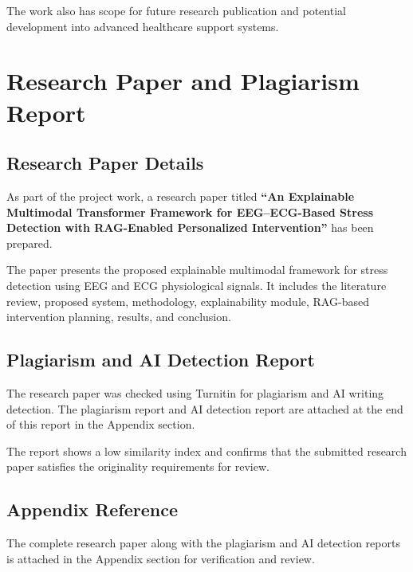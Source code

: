 \documentclass[12pt,a4paper]{report}
\begin{document}
The work also has scope for future research publication and potential development into advanced healthcare support systems.

\chapter{Research Paper and Plagiarism Report}

\section{Research Paper Details}

As part of the project work, a research paper titled 
\textbf{``An Explainable Multimodal Transformer Framework for EEG--ECG-Based Stress Detection with RAG-Enabled Personalized Intervention''}
has been prepared.

The paper presents the proposed explainable multimodal framework for stress detection using EEG and ECG physiological signals. It includes the literature review, proposed system, methodology, explainability module, RAG-based intervention planning, results, and conclusion.

\section{Plagiarism and AI Detection Report}

The research paper was checked using Turnitin for plagiarism and AI writing detection. The plagiarism report and AI detection report are attached at the end of this report in the Appendix section.

The report shows a low similarity index and confirms that the submitted research paper satisfies the originality requirements for review.

\section{Appendix Reference}

The complete research paper along with the plagiarism and AI detection reports is attached in the Appendix section for verification and review.


\renewcommand{\bibname}{References and Bibliography}

\end{document}
